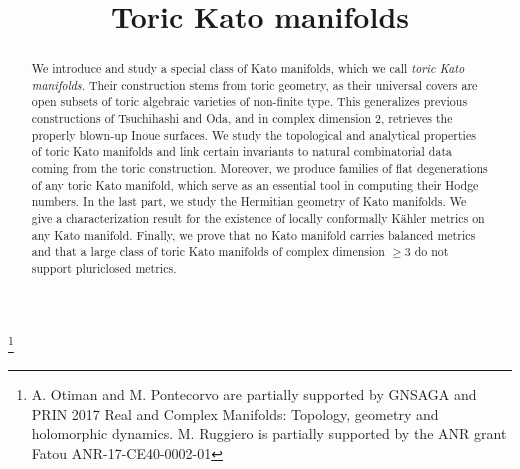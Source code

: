 \documentclass[JEP,XML,SOM,Unicode,NoFloatCountersInSection]{cedram}
\theoremstyle{definition}
\begin{document}
\frontmatter
\title{Toric Kato manifolds}
\author[\initial{N.} \lastname{Istrati}]{ }
\address{FB 12/Mathematik und Informatik, Philipps-Universität Marburg\\ Hans-Meerwein-Str. 6, 35032 Marburg, Germany}

\author[\initial{A.} \lastname{Otiman}]{ }
\address{Roma Tre University, Department of Mathematics and Physics\\ Largo San Leonardo Murialdo, Rome, Italy\\
\& Institute of Mathematics ``Simion Stoilow'' of the Romanian Academy\\
21, Calea Grivitei, 010702, Bucharest, Romania}

\author[\initial{M.} \lastname{Pontecorvo}]{\nobreakauthor {}}
\address{Roma Tre University, Department of Mathematics and Physics\\ Largo San Leonardo Murialdo, Rome, Italy}

\author[\initial{M.} \lastname{Ruggiero}]{ }
\address{Université Paris Cité, Sorbonne Université, CNRS, Institut de Mathématiques de Jussieu-Paris Rive Gauche\\
F-75006 Paris, France}

\thanks{A. Otiman and M. Pontecorvo are partially supported by GNSAGA and PRIN 2017 Real and Complex Manifolds: Topology, geometry and holomorphic dynamics. M. Ruggiero is partially supported by the ANR grant Fatou ANR-17-CE40-0002-01}

\begin{abstract}
We introduce and study a special class of Kato manifolds, which we call \emph{toric Kato manifolds}. Their construction stems from toric geometry, as their universal covers are open subsets of toric algebraic varieties of non-finite type. This generalizes previous constructions of Tsuchihashi and Oda, and in complex dimension $2$, retrieves the properly blown-up Inoue surfaces. We study the topological and analytical properties of toric Kato manifolds and link certain invariants to natural combinatorial data coming from the toric construction. Moreover, we produce families of flat degenerations of any toric Kato manifold, which serve as an essential tool in computing their Hodge numbers. In the last part, we study the Hermitian geometry of Kato manifolds. We give a characterization result for the existence of locally conformally Kähler metrics on any Kato manifold. Finally, we prove that no Kato manifold carries balanced metrics and that a large class of toric Kato manifolds of complex dimension $\geq 3$ do not support pluriclosed metrics.
\end{abstract}
\end{document}
